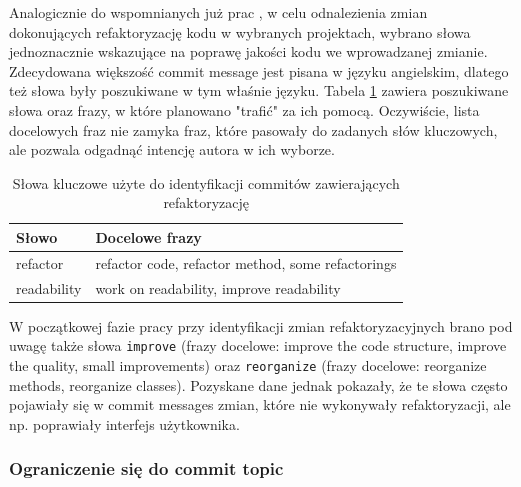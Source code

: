\documentclass[12pt]{report}
\begin{document}
Analogicznie do wspomnianych już prac \cite{ray2014large, shimagaki2016commits}, w celu odnalezienia zmian dokonujących refaktoryzację kodu w wybranych projektach, wybrano słowa jednoznacznie wskazujące na poprawę jakości kodu we wprowadzanej zmianie. Zdecydowana większość commit message jest pisana w języku angielskim, dlatego też słowa były poszukiwane w tym właśnie języku. Tabela \ref{tbl:impl:keywords} zawiera poszukiwane słowa oraz frazy, w które planowano "trafić" za ich pomocą. Oczywiście, lista docelowych fraz nie zamyka fraz, które pasowały do zadanych słów kluczowych, ale pozwala odgadnąć intencję autora w ich wyborze.

\begin{table}[t]
\caption{Słowa kluczowe użyte do identyfikacji commitów zawierających refaktoryzację}
\label{tbl:impl:keywords}
\begin{tabular}{|l|l|}
  \hline 
  \textbf{Słowo} & \textbf{Docelowe frazy} \\ \hline
  refactor & refactor code, refactor method, some refactorings \\ \hline
  readability & work on readability, improve readability \\ \hline
\end{tabular} 
\end{table}

W początkowej fazie pracy przy identyfikacji zmian refaktoryzacyjnych brano pod uwagę także słowa \texttt{improve} (frazy docelowe: improve the code structure, improve the quality, small improvements) oraz \texttt{reorganize} (frazy docelowe: reorganize methods, reorganize classes). Pozyskane dane jednak pokazały, że te słowa często pojawiały się w commit messages zmian, które nie wykonywały refaktoryzacji, ale np. poprawiały interfejs użytkownika.

\subsubsection{Ograniczenie się do commit topic}
\end{document}
